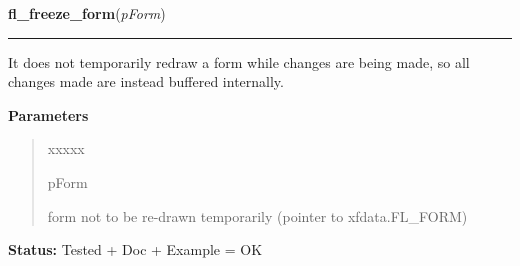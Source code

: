 \hspace{.8\funcindent}\begin{boxedminipage}{\funcwidth}

    \raggedright \textbf{fl\_freeze\_form}(\textit{pForm})

    \vspace{-1.5ex}

    \rule{\textwidth}{0.5\fboxrule}
\setlength{\parskip}{2ex}
    It does not temporarily redraw a form while changes are being made, so 
    all changes made are instead buffered internally.

\setlength{\parskip}{1ex}
      \textbf{Parameters}
      \vspace{-1ex}

      \begin{quote}
        \begin{Ventry}{xxxxx}

          \item[pForm]

          form not to be re-drawn temporarily (pointer to xfdata.FL\_FORM)

        \end{Ventry}

      \end{quote}

\textbf{Status:} Tested + Doc + Example = OK



    \end{boxedminipage}

    \label{xformslib:library:fl_set_focus_object}

    \vspace{0.5ex}


